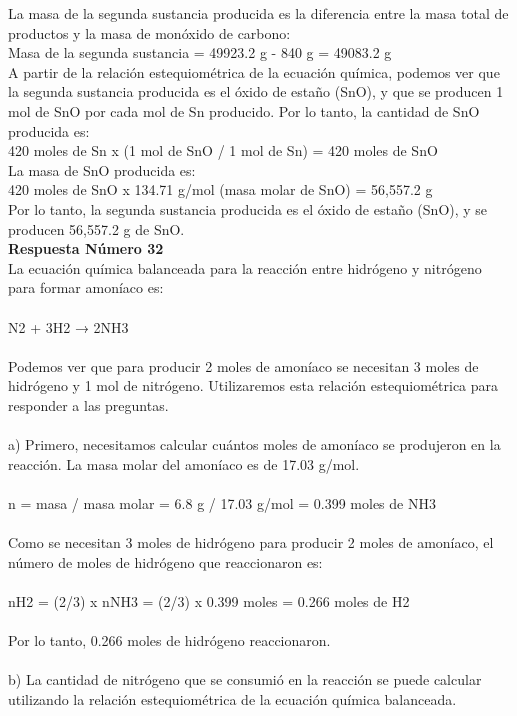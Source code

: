 \documentclass{article}
\begin{document}
La masa de la segunda sustancia producida es la diferencia entre la masa total de productos y la masa de monóxido de carbono:\\
Masa de la segunda sustancia = 49923.2 g - 840 g = 49083.2 g\\
A partir de la relación estequiométrica de la ecuación química, podemos ver que la segunda sustancia producida es el óxido de estaño (SnO), y que se producen 1 mol de SnO por cada mol de Sn producido. Por lo tanto, la cantidad de SnO producida es:\\
420 moles de Sn x (1 mol de SnO / 1 mol de Sn) = 420 moles de SnO\\
La masa de SnO producida es:\\
420 moles de SnO x 134.71 g/mol (masa molar de SnO) = 56,557.2 g\\
Por lo tanto, la segunda sustancia producida es el óxido de estaño (SnO), y se producen 56,557.2 g de SnO.\\
\textbf{Respuesta Número 32} \\
La ecuación química balanceada para la reacción entre hidrógeno y nitrógeno para formar amoníaco es:\\
\\
N2 + 3H2 → 2NH3\\
\\
Podemos ver que para producir 2 moles de amoníaco se necesitan 3 moles de hidrógeno y 1 mol de nitrógeno. Utilizaremos esta relación estequiométrica para responder a las preguntas.\\
\\
a) Primero, necesitamos calcular cuántos moles de amoníaco se produjeron en la reacción. La masa molar del amoníaco es de 17.03 g/mol.\\
\\
n = masa / masa molar = 6.8 g / 17.03 g/mol = 0.399 moles de NH3\\
\\
Como se necesitan 3 moles de hidrógeno para producir 2 moles de amoníaco, el número de moles de hidrógeno que reaccionaron es:\\
\\
nH2 = (2/3) x nNH3 = (2/3) x 0.399 moles = 0.266 moles de H2\\
\\
Por lo tanto, 0.266 moles de hidrógeno reaccionaron.\\
\\
b) La cantidad de nitrógeno que se consumió en la reacción se puede calcular utilizando la relación estequiométrica de la ecuación química balanceada.\\
\end{document}
